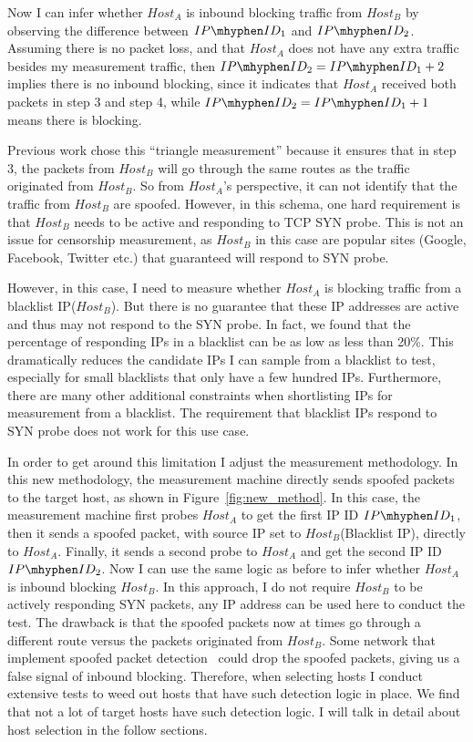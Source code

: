 Now I can infer whether $Host_A$ is inbound blocking traffic from $Host_B$ by
observing the difference between $IP\mhyphen ID_1$ and $IP\mhyphen ID_2$.
Assuming there is no packet loss, and that $Host_A$ does not have any extra
traffic besides my measurement traffic, then
$IP\mhyphen ID_2 = IP\mhyphen ID_1 + 2$ implies there is no inbound blocking,
since it indicates that $Host_A$ received both packets in step 3 and step 4,
while $IP\mhyphen ID_2 = IP\mhyphen ID_1 + 1$ means there is blocking.

Previous work chose this ``triangle measurement'' because it ensures that in
step 3, the packets from $Host_B$ will go through the same routes as the
traffic originated from $Host_B$. So from $Host_A$'s perspective, it can not
identify that the traffic from $Host_B$ are spoofed. However, in this schema,
one hard requirement is that $Host_B$ needs to be active and responding to TCP
SYN probe. This is not an issue for censorship measurement, as $Host_B$ in this
case are popular sites (Google, Facebook, Twitter etc.) that guaranteed will
respond to SYN probe.

However, in this case, I need to measure whether $Host_A$ is blocking traffic
from a blacklist IP($Host_B$). But there is no guarantee that these IP
addresses are active and thus may not respond to the SYN probe. In fact, we
found that the percentage of responding IPs in a blacklist can be as low as less
than 20\%. This dramatically reduces the candidate IPs I can sample from a
blacklist to test, especially for small blacklists that only have a few hundred
IPs. Furthermore, there are many other additional constraints when shortlisting
IPs for measurement from a blacklist.
The requirement that blacklist IPs respond to SYN probe does not work for this
use case. 

In order to get around this limitation I adjust the measurement methodology.
In this new methodology, the measurement machine directly sends spoofed
packets to the target host, as shown in Figure~\ref{fig:new_method}. In
this case, the measurement machine first probes $Host_A$ to get the first IP ID
$IP\mhyphen ID_1$, then it sends a spoofed packet, with source IP set to
$Host_B$(Blacklist IP), directly to $Host_A$. Finally, it sends a second probe
to $Host_A$ and get the second IP ID $IP\mhyphen ID_2$. Now I can use the same
logic as before to infer whether $Host_A$ is inbound blocking $Host_B$. In this
approach, I do not require $Host_B$ to be actively responding SYN packets, any
IP address can be used here to conduct the test. The drawback is that the
spoofed packets now at times go through a different route versus the packets
originated from $Host_B$. Some network that implement spoofed packet
detection~\cite{ferguson2000rfc2827} could drop the spoofed packets, giving us
a false signal of inbound blocking. Therefore, when selecting hosts I conduct
extensive tests to weed out hosts that have such detection logic in place. We
find that not a lot of target hosts have such detection logic. I will talk in
detail about host selection in the follow sections.



